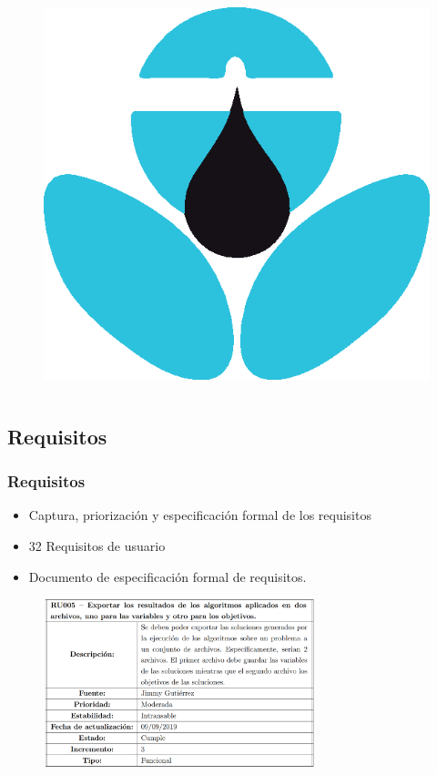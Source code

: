 \documentclass[9pt]{beamer}
\begin{document}
\begin{frame}
\begin{columns}
            \begin{figure}[H]
                \centering
                \includegraphics[width=\textwidth]{assets/Tecnologia/EpanetToolkit.eps}
            \end{figure}
        \end{columns}
    \end{frame}

    \subsection{Requisitos}
    \begin{frame}
        \frametitle{Requisitos}                 
        
        \begin{itemize}
            \item Captura, priorización y especificación formal de los requisitos
            \item 32 Requisitos de usuario
            \item Documento de especificación formal de requisitos.
        \end{itemize}
        \begin{figure}
            \includegraphics[width=0.7\textwidth]{assets/Requisito.png}
        \end{figure}
    \end{frame}
\end{document}
